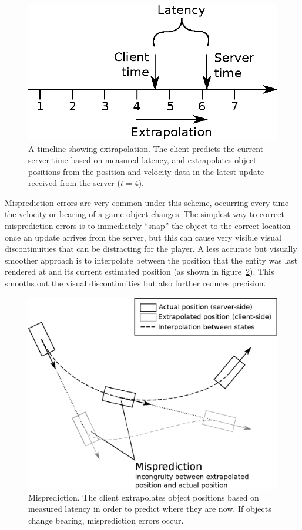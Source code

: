 \documentclass[conference]{IEEEtran}
\begin{document}
	\begin{figure}
		\centering\includegraphics[width=\linewidth]{figures/extrapolation_timeline.eps}
		\caption{A timeline showing extrapolation. The client predicts the current server time based on measured latency, and extrapolates object positions from the position and velocity data in the latest update received from the server ($t = 4$).}
		\label{fig:extrapolation_timeline}
	\end{figure}

	Misprediction errors are very common under this scheme, occurring every time the velocity or bearing of a game object changes. The simplest way to correct misprediction errors is to immediately ``snap'' the object to the correct location once an update arrives from the server, but this can cause very visible visual discontinuities that can be distracting for the player. A less accurate but visually smoother approach is to interpolate between the position that the entity was last rendered at and its current estimated position (as shown in figure~\ref{fig:extrapolation}). This smooths out the visual discontinuities but also further reduces precision.

	\begin{figure}
		\centering\includegraphics[width=\linewidth]{figures/extrapolation.eps}
		\caption{Misprediction. The client extrapolates object positions based on measured latency in order to predict where they are now. If objects change bearing, misprediction errors occur.}
		\label{fig:extrapolation}
	\end{figure}
\end{document}
